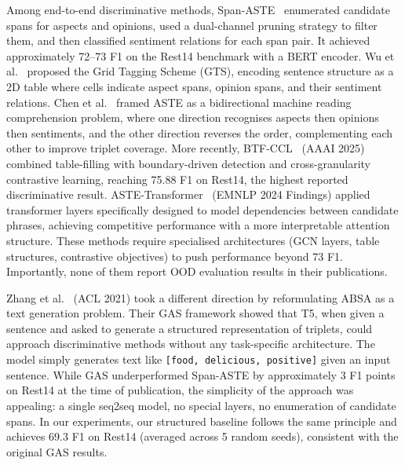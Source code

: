 \documentclass[12pt,a4paper]{report}
\begin{document}
Among end-to-end discriminative methods, Span-ASTE~\cite{xu2021learning} enumerated candidate spans for aspects and opinions, used a dual-channel pruning strategy to filter them, and then classified sentiment relations for each span pair. It achieved approximately 72--73 F1 on the Rest14 benchmark with a BERT encoder. Wu et al.~\cite{wu2020grid} proposed the Grid Tagging Scheme (GTS), encoding sentence structure as a 2D table where cells indicate aspect spans, opinion spans, and their sentiment relations. Chen et al.~\cite{chen2021bidirectional} framed ASTE as a bidirectional machine reading comprehension problem, where one direction recognises aspects then opinions then sentiments, and the other direction reverses the order, complementing each other to improve triplet coverage. More recently, BTF-CCL~\cite{btfccl2025} (AAAI 2025) combined table-filling with boundary-driven detection and cross-granularity contrastive learning, reaching 75.88 F1 on Rest14, the highest reported discriminative result. ASTE-Transformer~\cite{aste_transformer2024} (EMNLP 2024 Findings) applied transformer layers specifically designed to model dependencies between candidate phrases, achieving competitive performance with a more interpretable attention structure. These methods require specialised architectures (GCN layers, table structures, contrastive objectives) to push performance beyond 73 F1. Importantly, none of them report OOD evaluation results in their publications.

Zhang et al.~\cite{zhang2021towards} (ACL 2021) took a different direction by reformulating ABSA as a text generation problem. Their GAS framework showed that T5, when given a sentence and asked to generate a structured representation of triplets, could approach discriminative methods without any task-specific architecture. The model simply generates text like \texttt{[food, delicious, positive]} given an input sentence. While GAS underperformed Span-ASTE by approximately 3 F1 points on Rest14 at the time of publication, the simplicity of the approach was appealing: a single seq2seq model, no special layers, no enumeration of candidate spans. In our experiments, our structured baseline follows the same principle and achieves 69.3 F1 on Rest14 (averaged across 5 random seeds), consistent with the original GAS results.
\end{document}
